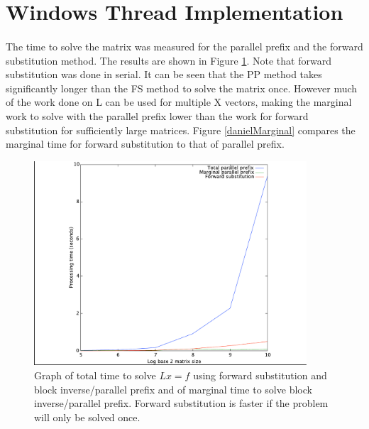 \documentclass[a4paper,12pt]{article}
\begin{document}
\section*{Windows Thread Implementation}
	\paragraph*{}
		The time to solve the matrix was measured for the parallel prefix and the forward substitution method.  The results are shown in Figure \ref{danielTimes}.  Note that forward substitution was done in serial.  It can be seen that the PP method takes significantly longer than the FS method to solve the matrix once.  However much of the work done on L can be used for multiple X vectors, making the marginal work to solve with the parallel prefix lower than the work for forward substitution for sufficiently large matrices.  Figure \ref{danielMarginal}  compares the marginal time for forward substitution to that of parallel prefix.  
		\begin{figure}[]
			\centering
			\caption{Graph of total time to solve $Lx=f$ using forward substitution and block inverse/parallel prefix and of marginal time to solve block inverse/parallel prefix.  Forward substitution is faster if the problem will only be solved once.}
			\label{danielTimes}
		
			\includegraphics[width=4in]{daniel-times-plot}
		\end{figure}
\end{document}
